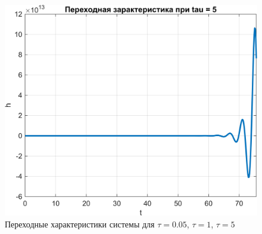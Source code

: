 \begin{figure}[H]
\begin{minipage}{0.45\textwidth}
    \end{minipage}
    \vfill
    \begin{minipage}{0.45\textwidth}
        \centering
        \includegraphics[width=\textwidth, trim={0cm 0cm 0cm 0cm}]{../images/3_2_7_cl.png}
    \end{minipage}
    \hfill
    \begin{minipage}{0.45\textwidth}
        \centering
    \end{minipage}
    \caption{Переходные характеристики системы для $\tau = 0.05$, $\tau = 1$, $\tau = 5$}
\end{figure}

\endinput